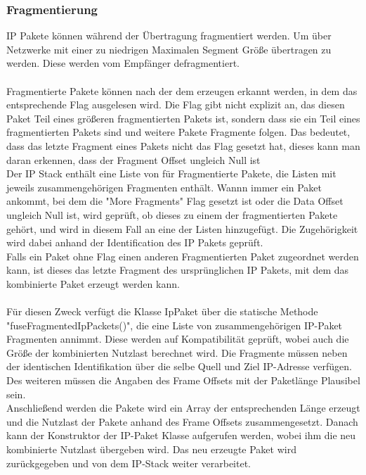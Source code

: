 \subsubsection{Fragmentierung}

IP Pakete können während der Übertragung fragmentiert werden. Um über Netzwerke mit einer zu niedrigen Maximalen Segment Größe übertragen zu werden. Diese werden vom Empfänger defragmentiert. \\\\
Fragmentierte Pakete können nach der dem erzeugen erkannt werden, in dem das entsprechende Flag ausgelesen wird. Die Flag gibt nicht explizit an, das diesen Paket Teil eines größeren fragmentierten Pakets ist, sondern dass sie ein Teil eines fragmentierten Pakets sind und weitere Pakete Fragmente folgen. Das bedeutet, dass das letzte Fragment eines Pakets nicht das Flag gesetzt hat, dieses kann man daran erkennen, dass der Fragment Offset ungleich Null ist\\
Der IP Stack enthält eine Liste von für Fragmentierte Pakete, die Listen mit jeweils zusammengehörigen Fragmenten enthält. Wannn immer ein Paket ankommt, bei dem die {}"More Fragments"{} Flag gesetzt ist oder die Data Offset ungleich Null ist, wird geprüft, ob dieses zu einem der fragmentierten Pakete gehört, und wird in diesem Fall an eine der Listen hinzugefügt. Die Zugehörigkeit wird dabei anhand der Identification des IP Pakets geprüft. \\
Falls ein Paket ohne Flag einen anderen Fragmentierten Paket zugeordnet werden kann, ist dieses das letzte Fragment des ursprünglichen IP Pakets, mit dem das kombinierte Paket erzeugt werden kann. \\\\
Für diesen Zweck verfügt die Klasse IpPaket über die statische Methode "{}fuseFragmentedIpPackets()"{}, die eine Liste von zusammengehörigen IP-Paket Fragmenten annimmt. Diese werden auf Kompatibilität geprüft, wobei auch die Größe der kombinierten Nutzlast berechnet wird. Die Fragmente müssen neben der identischen Identifikation über die selbe Quell und Ziel IP-Adresse verfügen. Des weiteren müssen die Angaben des Frame Offsets mit der Paketlänge Plausibel sein. \\
Anschließend werden die Pakete wird ein Array der entsprechenden Länge erzeugt und die Nutzlast der Pakete anhand des Frame Offsets zusammengesetzt. Danach kann der Konstruktor der IP-Paket Klasse aufgerufen werden, wobei ihm die neu kombinierte Nutzlast übergeben wird.  Das neu erzeugte Paket wird zurückgegeben und von dem IP-Stack weiter verarbeitet. 


